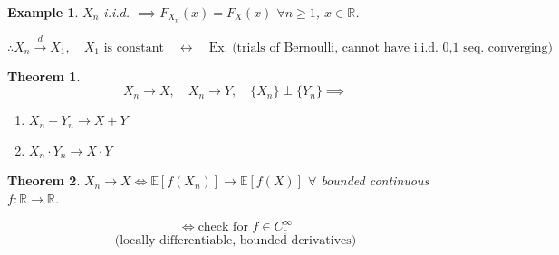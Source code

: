 \documentclass{article}
\newcommand{\1}{\mathds{1}}
\newtheorem{theorem}{Theorem}[section]
\newtheorem{example}{Example}
\begin{document}
\begin{example} \( X_n \) i.i.d. \(\implies F_{X_n}(x) = F_X(x)\) \(\forall n \geq 1\), \(x \in \mathbb{R}\).

\[
\therefore X_n \xrightarrow{d} X_1, \quad X_1 \text{ is constant} \quad \longleftrightarrow \quad \text{Ex. (trials of Bernoulli, cannot have i.i.d. 0,1 seq. converging)}
\]
\end{example}
\begin{theorem}
    \[
X_n \to X, \quad X_n \to Y, \quad \{X_n\} \perp \{Y_n\}\implies
\]
\begin{enumerate}
    \item \(X_n + Y_n \to X + Y\)
    \item \(X_n \cdot Y_n \to X \cdot Y\)
\end{enumerate}
\end{theorem}
\begin{theorem} \(X_n \to X \iff \mathbb{E}[f(X_n)] \to \mathbb{E}[f(X)]\) \(\forall\) bounded continuous \(f: \mathbb{R} \to \mathbb{R}\).

\[
\iff \text{check for } f \in C_c^\infty
\]
\[
\text{(locally differentiable, bounded derivatives)}
\]
\end{theorem}
\end{document}
